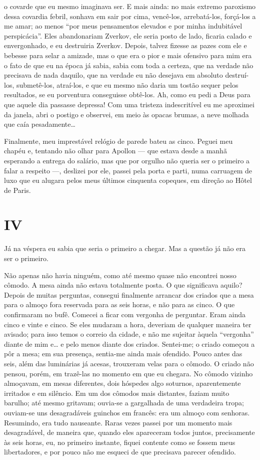 o covarde que eu mesmo imaginava ser. E mais ainda: no mais extremo
paroxismo dessa covardia febril, sonhava em sair por cima, vencê-los,
arrebatá-los, forçá-los a me amar; ao menos “por meus pensamentos
elevados e por minha indubitável perspicácia”. Eles abandonariam
Zverkov, ele seria posto de lado, ficaria calado e envergonhado, e eu
destruiria Zverkov. Depois, talvez fizesse as pazes com ele e bebesse
para selar a amizade, mas o que era o pior e mais ofensivo para mim era
o fato de que eu na época já sabia, sabia com toda a certeza, que na
verdade não precisava de nada daquilo, que na verdade eu não desejava
em absoluto destruí-los, submetê-los, atraí-los, e que eu mesmo não
daria um tostão sequer pelos resultados, se eu porventura conseguisse
obtê-los. Ah, como eu pedi a Deus para que aquele dia passasse
depressa! Com uma tristeza indescritível eu me aproximei da janela,
abri o postigo e observei, em meio às opacas brumas, a neve molhada que
caía pesadamente\ldots{}

Finalmente, meu imprestável relógio de parede bateu as cinco. Peguei meu
chapéu e, tentando não olhar para Apollon --- que estava desde a manhã
esperando a entrega do salário, mas que por orgulho não queria ser o
primeiro a falar a respeito ---, deslizei por ele, passei pela porta e
parti, numa carruagem de luxo que eu alugara pelos meus últimos
cinquenta copeques, em direção ao Hôtel de \mbox{Paris}.


\section{IV}

Já na véspera eu sabia que seria o primeiro a chegar. Mas a questão já
não era ser o primeiro.

Não apenas não havia ninguém, como até mesmo quase não encontrei nosso
cômodo. A mesa ainda não estava totalmente posta. O que significava
aquilo? Depois de muitas perguntas, consegui finalmente arrancar dos
criados que a mesa para o almoço fora reservada para as seis horas, e
não para as cinco. O que confirmaram no bufê. Comecei a ficar com
vergonha de perguntar. Eram ainda cinco e vinte e cinco. Se eles
mudaram a hora, deveriam de qualquer maneira ter avisado; para isso
temos o correio da cidade, e não me sujeitar àquela “vergonha” diante
de mim e\ldots{} e pelo menos diante dos criados. Sentei-me; o criado começou
a pôr a mesa; em sua presença, sentia-me ainda mais ofendido. Pouco
antes das seis, além das luminárias já acesas, trouxeram velas para o
cômodo. O criado não pensou, porém, em trazê-las no momento em que eu
chegara. No cômodo vizinho almoçavam, em mesas diferentes, dois
hóspedes algo soturnos, aparentemente irritados e em silêncio. Em um
dos cômodos mais distantes, faziam muito barulho; até mesmo gritavam;
ouvia-se a gargalhada de uma verdadeira tropa; ouviam-se uns
desagradáveis guinchos em francês: era um almoço com senhoras.
Resumindo, era tudo nauseante. Raras vezes passei por um momento mais
desagradável, de maneira que, quando eles apareceram todos juntos,
precisamente às seis horas, eu, no primeiro instante, fiquei contente
como se fossem meus libertadores, e por pouco não me esqueci de que
precisava parecer ofendido.

